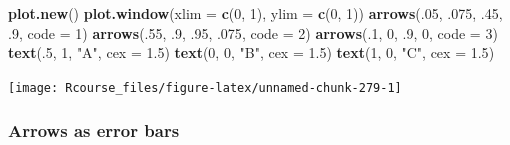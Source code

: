 \documentclass[]{book}
\newenvironment{Shaded}{\begin{snugshade}}{\end{snugshade}}
\newcommand{\DataTypeTok}[1]{\textcolor[rgb]{0.13,0.29,0.53}{#1}}
\newcommand{\DecValTok}[1]{\textcolor[rgb]{0.00,0.00,0.81}{#1}}
\newcommand{\FloatTok}[1]{\textcolor[rgb]{0.00,0.00,0.81}{#1}}
\newcommand{\KeywordTok}[1]{\textcolor[rgb]{0.13,0.29,0.53}{\textbf{#1}}}
\newcommand{\NormalTok}[1]{#1}
\newcommand{\StringTok}[1]{\textcolor[rgb]{0.31,0.60,0.02}{#1}}
\theoremstyle{definition}
\theoremstyle{definition}
\theoremstyle{definition}
\theoremstyle{remark}
\begin{document}
\begin{Shaded}
\begin{Highlighting}[]
\KeywordTok{plot.new}\NormalTok{()}
\KeywordTok{plot.window}\NormalTok{(}\DataTypeTok{xlim =} \KeywordTok{c}\NormalTok{(}\DecValTok{0}\NormalTok{, }\DecValTok{1}\NormalTok{), }\DataTypeTok{ylim =} \KeywordTok{c}\NormalTok{(}\DecValTok{0}\NormalTok{, }\DecValTok{1}\NormalTok{))}
\KeywordTok{arrows}\NormalTok{(.}\DecValTok{05}\NormalTok{, }\FloatTok{.075}\NormalTok{, }\FloatTok{.45}\NormalTok{, }\FloatTok{.9}\NormalTok{, }\DataTypeTok{code =} \DecValTok{1}\NormalTok{)}
\KeywordTok{arrows}\NormalTok{(.}\DecValTok{55}\NormalTok{, }\FloatTok{.9}\NormalTok{, }\FloatTok{.95}\NormalTok{, }\FloatTok{.075}\NormalTok{, }\DataTypeTok{code =} \DecValTok{2}\NormalTok{)}
\KeywordTok{arrows}\NormalTok{(.}\DecValTok{1}\NormalTok{, }\DecValTok{0}\NormalTok{, }\FloatTok{.9}\NormalTok{, }\DecValTok{0}\NormalTok{, }\DataTypeTok{code =} \DecValTok{3}\NormalTok{)}
\KeywordTok{text}\NormalTok{(.}\DecValTok{5}\NormalTok{, }\DecValTok{1}\NormalTok{, }\StringTok{"A"}\NormalTok{, }\DataTypeTok{cex =} \FloatTok{1.5}\NormalTok{)}
\KeywordTok{text}\NormalTok{(}\DecValTok{0}\NormalTok{, }\DecValTok{0}\NormalTok{, }\StringTok{"B"}\NormalTok{, }\DataTypeTok{cex =} \FloatTok{1.5}\NormalTok{)}
\KeywordTok{text}\NormalTok{(}\DecValTok{1}\NormalTok{, }\DecValTok{0}\NormalTok{, }\StringTok{"C"}\NormalTok{, }\DataTypeTok{cex =} \FloatTok{1.5}\NormalTok{)}
\end{Highlighting}
\end{Shaded}

\texttt{[image: Rcourse\_files/figure-latex/unnamed-chunk-279-1]}

\hypertarget{arrows-as-error-bars}{%
\subsubsection{Arrows as error bars}\label{arrows-as-error-bars}}
\end{document}
